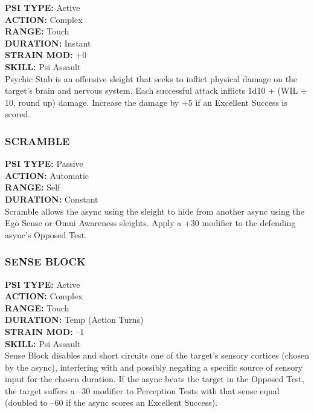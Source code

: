 \textbf{PSI TYPE:} Active \\ \textbf{ACTION:} Complex \\ \textbf{RANGE:} Touch \\ \textbf{DURATION:} Instant \\ \textbf{STRAIN MOD:} +0 \\ \textbf{SKILL:} Psi Assault \\ Psychic Stab is an offensive sleight that seeks to inflict physical damage on the target’s brain and nervous system. Each successful attack inflicts 1d10 + (WIL $\div$ 10, round up) damage. Increase the damage by +5 if an Excellent Success is scored. 

\subsubsection{SCRAMBLE} \textbf{PSI TYPE:} Passive \\ \textbf{ACTION:} Automatic \\ \textbf{RANGE:} Self \\ \textbf{DURATION:} Constant \\ Scramble allows the async using the sleight to hide from another async using the Ego Sense or Omni Awareness sleights. Apply a +30 modifier to the defending async’s Opposed Test. 

\subsubsection{SENSE BLOCK} \textbf{PSI TYPE:} Active \\ \textbf{ACTION:} Complex \\ \textbf{RANGE:} Touch \\ \textbf{DURATION:} Temp (Action Turns) \\ \textbf{STRAIN MOD:} –1 \\ \textbf{SKILL:} Psi Assault \\ Sense Block disables and short circuits one of the target’s sensory cortices (chosen by the async), interfering with and possibly negating a specific source of sensory input for the chosen duration. If the async beats the target in the Opposed Test, the target suffers a –30 modifier to Perception Tests with that sense equal (doubled to –60 if the async scores an Excellent Success). 



